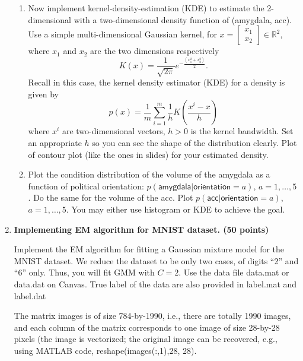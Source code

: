 \documentclass[twoside,10pt]{article}
\begin{document}
\begin{enumerate}
\begin{enumerate}
 \item Now implement kernel-density-estimation (KDE) to estimate the 2-dimensional with a two-dimensional density function of (\textsf{amygdala}, \textsf{acc}). Use a simple multi-dimensional Gaussian kernel, for $x = \begin{bmatrix}x_1\\x_2\end{bmatrix}\in \mathbb R^2$, where $x_1$ and $x_2$ are the two dimensions respectively \[K(x) = \frac{1}{\sqrt {2\pi}} e^{-\frac{(x_1^2 + x_2^2)}{2}}.\] Recall in this case, the kernel density estimator (KDE) for a density is given by
 \[
 p(x) = \frac 1 m \sum_{i=1}^m \frac 1 h
 K\left(
 \frac{x^i - x}{h}
 \right)
 \]
 where $x^i$ are two-dimensional vectors, $h >0$ is the kernel bandwidth. Set an appropriate $h$ so you can see the shape of the distribution clearly. Plot of contour plot (like the ones in slides) for your estimated density. 
 \item Plot the condition distribution of the volume of the \textsf{amygdala} as a function of political \textsf{orientation}: $p(\textsf{amygdala}|\textsf{orientation}=a)$, $a = 1, \ldots, 5$. Do the same for the volume of the 
 \textsf{acc}. Plot $p(\textsf{acc}|\textsf{orientation}=a)$, $a = 1, \ldots, 5$. You may either use histogram or KDE to achieve the goal.
 \end{enumerate}



\item {\bf Implementing EM algorithm for MNIST dataset. (50 points)} 

 Implement the EM algorithm for fitting a Gaussian mixture model for the MNIST dataset. We reduce the dataset to be only two cases, of digits ``2'' and ``6'' only. Thus, you will fit GMM with $C = 2$. Use the data file \textsf{data.mat} or \textsf{data.dat} on Canvas. True label of the data are also provided in \textsf{label.mat} and \textsf{label.dat}

The matrix \textsf{images} is of size 784-by-1990, i.e., there are totally 1990 images, and each column of the matrix corresponds to one image of size 28-by-28 pixels (the image is vectorized; the original image can be recovered, e.g., using MATLAB code, \textsf{reshape(images(:,1),28, 28)}.



\end{enumerate}
\end{document}
